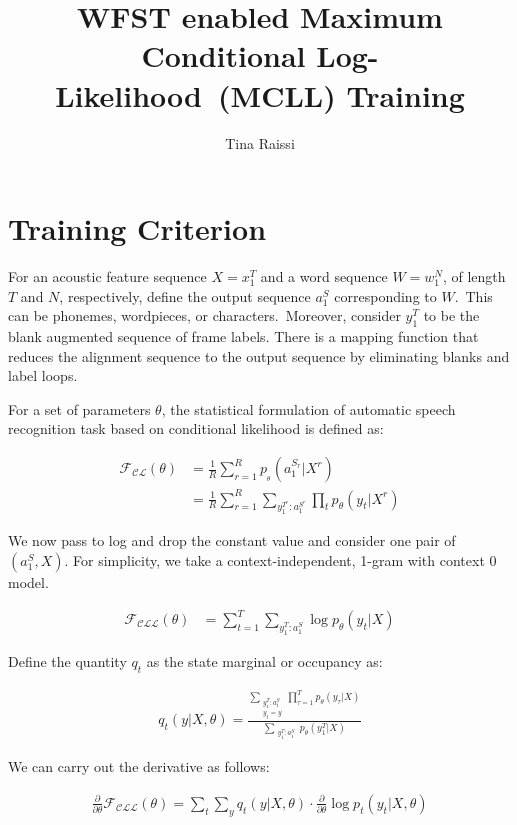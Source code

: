 \documentclass[a4paper,13.5pt]{extarticle}
\title{WFST enabled Maximum Conditional Log-Likelihood~(MCLL) Training}
\author{Tina Raissi}
\begin{document}
	
	\maketitle
	
	\section{Training Criterion}
	For an acoustic feature sequence $X = x_1^T$ and a word sequence $W = w_1^N$, of length $T$ and $N$, respectively, define the output sequence $a_1^S$ corresponding to $W$.\  This can be phonemes, wordpieces, or characters.\ Moreover, consider $y_1^T$ to be the blank augmented sequence of frame labels. There is a mapping function that reduces the alignment sequence to the output sequence by eliminating blanks and label loops.
	
	For a set of parameters $\theta$, the statistical formulation of automatic speech recognition task based on conditional likelihood is defined as:
	
	
	\begin{align}
		\label{CL}
		\mathcal{F_{\text{CL}}}(\theta) & = \frac{1}{R}\sum_{r=1}^R p_{_\theta}(a_1^{S_r} | X^r)\\
		& = \frac{1}{R}\sum_{r=1}^R \sum_{y_1^{T^r}:a_1^{S^r}} \prod_ t  p_{\theta}(y_t | X^r)
	\end{align}

We now pass to log and drop the constant value and consider one pair of $(a_1^S , X)$. For simplicity, we take a context-independent, 1-gram with context 0 model.

	\begin{align}
	\label{CLL}
	\mathcal{F_{\text{CLL}}}(\theta) & =\sum_{t=1}^T \sum_{y_1^{T}:a_1^{S}}  \log p_{\theta}(y_t | X)
\end{align}


Define the quantity $q_t$ as the state marginal or occupancy as:

\begin{align}
	q_t(y|X,\theta) = \frac{ \sum_{\substack{y_1^{T}:a_1^{S} \\ y_t=y} }\prod_{\tau=1}^T  p_{\theta} (y_{\tau} | X)}{\sum_{\substack{y_1^{T}:a_1^{S}} } p_{\theta} (y_1^T | X)}
\end{align}

We can carry out the derivative as follows:


	\begin{align*}
		\frac{\partial}{\partial \theta} \mathcal{F_{\text{CLL}}}(\theta) = \sum_{t}\sum_{y}{q_t(y|X,\theta)}\cdot \frac{\partial}{\partial \theta}  \log p_t(y_t|X,\theta)
\end{align*}%
\end{document}
